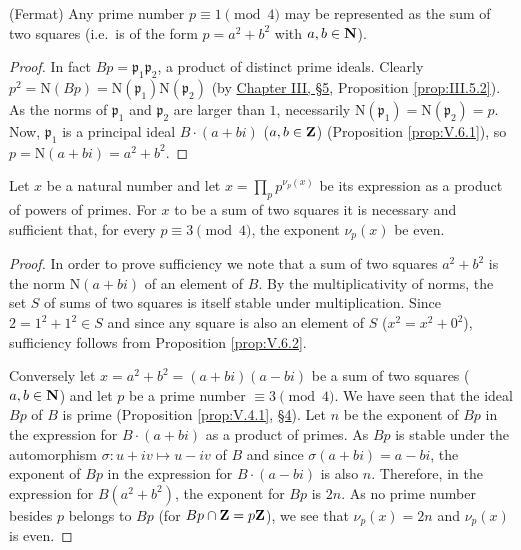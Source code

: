 \begin{proposition}
\label{prop:V.6.2}
(Fermat) Any prime number $p\equiv1\pmod4$ may be represented as the sum
of two squares (i.e.\ is of the form $p=a^{2}+b^{2}$ with $a,b\in\mathbf{N}$).
\end{proposition}

\begin{proof}
In fact $Bp=\mathfrak{p}_{1}\mathfrak{p}_{2}$, a product of distinct prime
ideals. Clearly $p^{2}=\mathrm{N}(Bp)
=\mathrm{N}(\mathfrak{p}_{1})\mathrm{N}(\mathfrak{p}_{2})$ (by \hyperref[sec:3.5]{Chapter III,
§5}, Proposition \ref{prop:III.5.2}). As the norms of $\mathfrak{p}_{1}$ and
$\mathfrak{p}_{2}$ are larger than $1$, necessarily
$\mathrm{N}(\mathfrak{p}_{1})=\mathrm{N}(\mathfrak{p}_{2})=p$. Now,
$\mathfrak{p}_{1}$ is a principal ideal $B\cdot(a+bi)$ ($a,b\in\mathbf{Z}$)
(Proposition \ref{prop:V.6.1}), so
$p=\mathrm{N}(a+bi)=a^{2}+b^{2}$.
\end{proof}

\begin{theorem}
\label{thm:V.6.1}
Let $x$ be a natural number and let
$x=\prod_{p}p^{\nu_{p}(x)}$ be its expression as a product of powers of
primes. For $x$ to be a sum of two squares it is necessary and sufficient
that, for every $p\equiv3\pmod4$, the exponent $\nu_{p}(x)$ be even.
\end{theorem}

\begin{proof}
In order to prove sufficiency we note that a sum of two squares
$a^{2}+b^{2}$ is the norm $\mathrm{N}(a+bi)$ of an element of $B$. By the
multiplicativity of norms, the set $S$ of sums of two squares is itself
stable under multiplication. Since $2=1^{2}+1^{2}\in S$ and since any
square is also an element of $S$ ($x^{2}=x^{2}+0^{2}$), sufficiency follows
from Proposition \ref{prop:V.6.2}.

Conversely let $x=a^{2}+b^{2}=(a+bi)(a-bi)$ be a sum of two squares
($a,b\in\mathbf{N}$) and let $p$ be a prime number $\equiv3\pmod4$. We have seen
that the ideal $Bp$ of $B$ is prime (Proposition \ref{prop:V.4.1}, \hyperref[sec:5.4]{§4}). Let
$n$ be the exponent of $Bp$ in the expression for $B\cdot(a+bi)$ as a
product of primes. As $Bp$ is stable under the automorphism
$\sigma:u+iv\mapsto u-iv$ of $B$ and since $\sigma(a+bi)=a-bi$, the
exponent of $Bp$ in the expression for $B\cdot(a-bi)$ is also $n$.
Therefore, in the expression for $B(a^{2}+b^{2})$, the exponent for $Bp$ is
$2n$. As no prime number besides $p$ belongs to $Bp$ (for
$Bp\cap\mathbf{Z}=p\mathbf{Z}$), we see that $\nu_{p}(x)=2n$ and $\nu_{p}(x)$ is even.
\end{proof}

